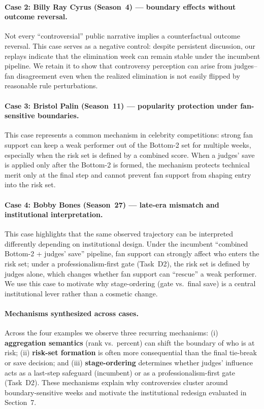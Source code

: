 \paragraph{Case 2: Billy Ray Cyrus (Season~4) --- boundary effects without outcome reversal.}
Not every ``controversial'' public narrative implies a counterfactual outcome reversal. This case serves as a negative control: despite persistent discussion,
our replays indicate that the elimination week can remain stable under the incumbent pipeline.
We retain it to show that controversy perception can arise from judges--fan disagreement even when the realized elimination is not easily flipped by reasonable rule perturbations.

\paragraph{Case 3: Bristol Palin (Season~11) --- popularity protection under fan-sensitive boundaries.}
This case represents a common mechanism in celebrity competitions: strong fan support can keep a weak performer out of the Bottom-2 set for multiple weeks,
especially when the risk set is defined by a combined score.
When a judges' save is applied only after the Bottom-2 is formed, the mechanism protects technical merit only at the final step and cannot prevent fan support from shaping entry into the risk set.

\paragraph{Case 4: Bobby Bones (Season~27) --- late-era mismatch and institutional interpretation.}
This case highlights that the same observed trajectory can be interpreted differently depending on institutional design.
Under the incumbent ``combined Bottom-2 + judges' save'' pipeline, fan support can strongly affect who enters the risk set;
under a professionalism-first gate (Task~D2), the risk set is defined by judges alone, which changes whether fan support can ``rescue'' a weak performer.
We use this case to motivate why stage-ordering (gate vs.\ final save) is a central institutional lever rather than a cosmetic change.



\paragraph{Mechanisms synthesized across cases.}
Across the four examples we observe three recurring mechanisms:
(i) \textbf{aggregation semantics} (rank vs.\ percent) can shift the boundary of who is at risk;
(ii) \textbf{risk-set formation} is often more consequential than the final tie-break or save decision; and
(iii) \textbf{stage-ordering} determines whether judges' influence acts as a last-step safeguard (incumbent) or as a professionalism-first gate (Task~D2).
These mechanisms explain why controversies cluster around boundary-sensitive weeks and motivate the institutional redesign evaluated in Section~7.


